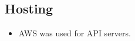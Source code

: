 \documentclass[hidelinks, 12pt, a4paper]{article}
\begin{document}
\begin{itemize}
    \subsection{Hosting}
    \begin{itemize}
        \item AWS was used for API servers.
    \end{itemize}





\end{itemize}
\end{document}
